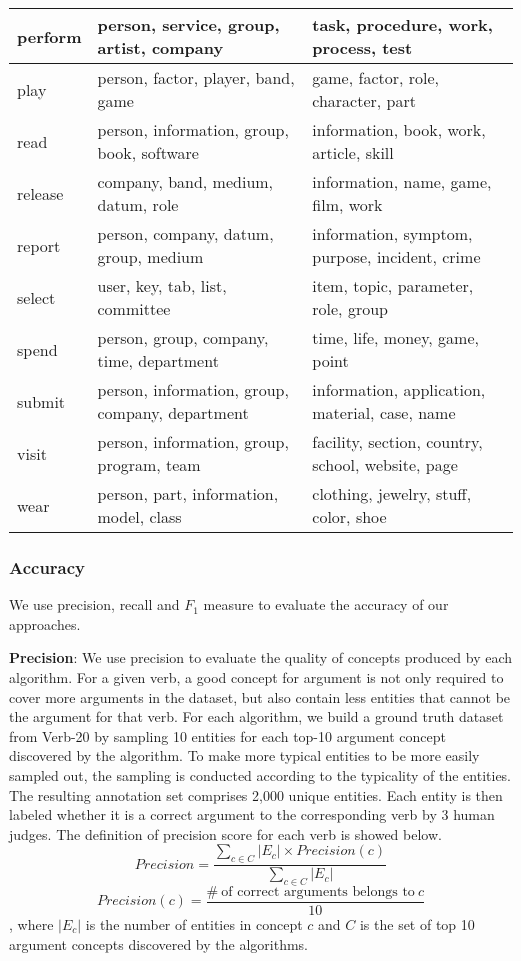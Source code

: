 \begin{table*}[th]
\begin{tabular}{|l|l|l|}
    \hline
    perform & person, service, group, artist, company & task, procedure, work, process, test \\
    \hline
    play  & person, factor, player, band, game & game, factor, role, character, part \\
    \hline
    read  & person, information, group, book, software & information, book, work, article, skill \\
    \hline
    release & company, band, medium, datum, role & information, name, game, film, work \\
    \hline
    report & person, company, datum, group, medium & information, symptom, purpose, incident, crime \\
    \hline
    select & user, key, tab, list, committee & item, topic, parameter, role, group \\
    \hline
    spend & person, group, company, time, department & time, life, money, game, point \\
    \hline
    submit & person, information, group, company, department & information, application, material, case, name \\
    \hline
    visit & person, information, group, program, team & facility, section, country, school, website, page \\
    \hline
    wear  & person, part, information, model, class & clothing, jewelry, stuff, color, shoe \\
    \hline
    \end{tabular}%
\label{tab:top5result}
\end{table*}


\subsubsection{Accuracy}
We use precision, recall and $F_1$ measure to evaluate the accuracy of our
approaches.

\textbf{Precision}: We use precision to evaluate the quality of concepts produced by each
algorithm. For a given verb, a good concept for argument is not only required to
cover more arguments in the dataset, but also contain less entities
that cannot be the argument for that verb. For each algorithm,
we build a ground truth dataset from Verb-20 by
sampling 10 entities for each top-10 argument concept discovered by the algorithm.
To make more typical entities to be more easily sampled out,
the sampling is conducted according to the typicality of the entities.
The resulting annotation set comprises 2,000 unique entities.
Each entity is then labeled whether it is a correct argument to the corresponding verb
 by 3 human judges. The definition of precision score for each verb is showed below.
$$
Precision = \frac{\sum_{c \in C}|E_c|\times Precision(c)}{\sum_{c \in C}{|E_c|}}
$$
$$
Precision(c)=\frac{\#\ \mbox{of\ correct\ arguments\ belongs\ to}\ c}{10}
$$
, where $|E_c|$ is the number of entities in concept $c$ and
$C$ is the set of top 10 argument concepts discovered by the algorithms.


